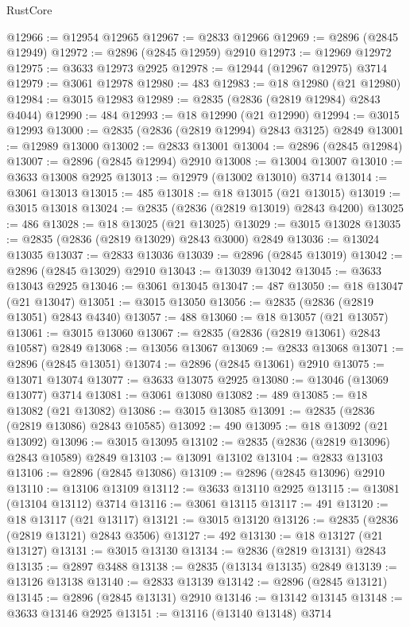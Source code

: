 \begin{lexlean}{RustCore}
\begin{coremodule}
@12966 := @12954 @12965
@12967 := @2833 @12966
@12969 := @2896 (@2845 @12949)
@12972 := @2896 (@2845 @12959) @2910
@12973 := @12969 @12972
@12975 := @3633 @12973 @2925
@12978 := @12944 (@12967 @12975) @3714
@12979 := @3061 @12978
@12980 := 483
@12983 := @18 @12980 (@21 @12980)
@12984 := @3015 @12983
@12989 := @2835 (@2836 (@2819 @12984) @2843 @4044)
@12990 := 484
@12993 := @18 @12990 (@21 @12990)
@12994 := @3015 @12993
@13000 := @2835 (@2836 (@2819 @12994) @2843 @3125) @2849
@13001 := @12989 @13000
@13002 := @2833 @13001
@13004 := @2896 (@2845 @12984)
@13007 := @2896 (@2845 @12994) @2910
@13008 := @13004 @13007
@13010 := @3633 @13008 @2925
@13013 := @12979 (@13002 @13010) @3714
@13014 := @3061 @13013
@13015 := 485
@13018 := @18 @13015 (@21 @13015)
@13019 := @3015 @13018
@13024 := @2835 (@2836 (@2819 @13019) @2843 @4200)
@13025 := 486
@13028 := @18 @13025 (@21 @13025)
@13029 := @3015 @13028
@13035 := @2835 (@2836 (@2819 @13029) @2843 @3000) @2849
@13036 := @13024 @13035
@13037 := @2833 @13036
@13039 := @2896 (@2845 @13019)
@13042 := @2896 (@2845 @13029) @2910
@13043 := @13039 @13042
@13045 := @3633 @13043 @2925
@13046 := @3061 @13045
@13047 := 487
@13050 := @18 @13047 (@21 @13047)
@13051 := @3015 @13050
@13056 := @2835 (@2836 (@2819 @13051) @2843 @4340)
@13057 := 488
@13060 := @18 @13057 (@21 @13057)
@13061 := @3015 @13060
@13067 := @2835 (@2836 (@2819 @13061) @2843 @10587) @2849
@13068 := @13056 @13067
@13069 := @2833 @13068
@13071 := @2896 (@2845 @13051)
@13074 := @2896 (@2845 @13061) @2910
@13075 := @13071 @13074
@13077 := @3633 @13075 @2925
@13080 := @13046 (@13069 @13077) @3714
@13081 := @3061 @13080
@13082 := 489
@13085 := @18 @13082 (@21 @13082)
@13086 := @3015 @13085
@13091 := @2835 (@2836 (@2819 @13086) @2843 @10585)
@13092 := 490
@13095 := @18 @13092 (@21 @13092)
@13096 := @3015 @13095
@13102 := @2835 (@2836 (@2819 @13096) @2843 @10589) @2849
@13103 := @13091 @13102
@13104 := @2833 @13103
@13106 := @2896 (@2845 @13086)
@13109 := @2896 (@2845 @13096) @2910
@13110 := @13106 @13109
@13112 := @3633 @13110 @2925
@13115 := @13081 (@13104 @13112) @3714
@13116 := @3061 @13115
@13117 := 491
@13120 := @18 @13117 (@21 @13117)
@13121 := @3015 @13120
@13126 := @2835 (@2836 (@2819 @13121) @2843 @3506)
@13127 := 492
@13130 := @18 @13127 (@21 @13127)
@13131 := @3015 @13130
@13134 := @2836 (@2819 @13131) @2843
@13135 := @2897 @3488
@13138 := @2835 (@13134 @13135) @2849
@13139 := @13126 @13138
@13140 := @2833 @13139
@13142 := @2896 (@2845 @13121)
@13145 := @2896 (@2845 @13131) @2910
@13146 := @13142 @13145
@13148 := @3633 @13146 @2925
@13151 := @13116 (@13140 @13148) @3714

\end{coremodule}
\end{lexlean}
